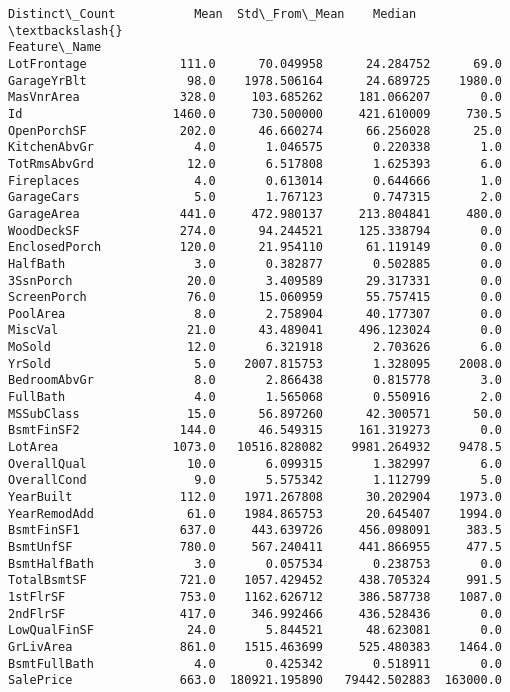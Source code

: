 \documentclass[11pt]{article}
\begin{document}
\begin{tcolorbox}[breakable, boxrule=.5pt, size=fbox, pad at break*=1mm, opacityfill=0]
\begin{Verbatim}[commandchars=\\\{\}]
               Distinct\_Count           Mean  Std\_From\_Mean    Median  \textbackslash{}
Feature\_Name
LotFrontage             111.0      70.049958      24.284752      69.0
GarageYrBlt              98.0    1978.506164      24.689725    1980.0
MasVnrArea              328.0     103.685262     181.066207       0.0
Id                     1460.0     730.500000     421.610009     730.5
OpenPorchSF             202.0      46.660274      66.256028      25.0
KitchenAbvGr              4.0       1.046575       0.220338       1.0
TotRmsAbvGrd             12.0       6.517808       1.625393       6.0
Fireplaces                4.0       0.613014       0.644666       1.0
GarageCars                5.0       1.767123       0.747315       2.0
GarageArea              441.0     472.980137     213.804841     480.0
WoodDeckSF              274.0      94.244521     125.338794       0.0
EnclosedPorch           120.0      21.954110      61.119149       0.0
HalfBath                  3.0       0.382877       0.502885       0.0
3SsnPorch                20.0       3.409589      29.317331       0.0
ScreenPorch              76.0      15.060959      55.757415       0.0
PoolArea                  8.0       2.758904      40.177307       0.0
MiscVal                  21.0      43.489041     496.123024       0.0
MoSold                   12.0       6.321918       2.703626       6.0
YrSold                    5.0    2007.815753       1.328095    2008.0
BedroomAbvGr              8.0       2.866438       0.815778       3.0
FullBath                  4.0       1.565068       0.550916       2.0
MSSubClass               15.0      56.897260      42.300571      50.0
BsmtFinSF2              144.0      46.549315     161.319273       0.0
LotArea                1073.0   10516.828082    9981.264932    9478.5
OverallQual              10.0       6.099315       1.382997       6.0
OverallCond               9.0       5.575342       1.112799       5.0
YearBuilt               112.0    1971.267808      30.202904    1973.0
YearRemodAdd             61.0    1984.865753      20.645407    1994.0
BsmtFinSF1              637.0     443.639726     456.098091     383.5
BsmtUnfSF               780.0     567.240411     441.866955     477.5
BsmtHalfBath              3.0       0.057534       0.238753       0.0
TotalBsmtSF             721.0    1057.429452     438.705324     991.5
1stFlrSF                753.0    1162.626712     386.587738    1087.0
2ndFlrSF                417.0     346.992466     436.528436       0.0
LowQualFinSF             24.0       5.844521      48.623081       0.0
GrLivArea               861.0    1515.463699     525.480383    1464.0
BsmtFullBath              4.0       0.425342       0.518911       0.0
SalePrice               663.0  180921.195890   79442.502883  163000.0


\end{Verbatim}
\end{tcolorbox}
\end{document}
